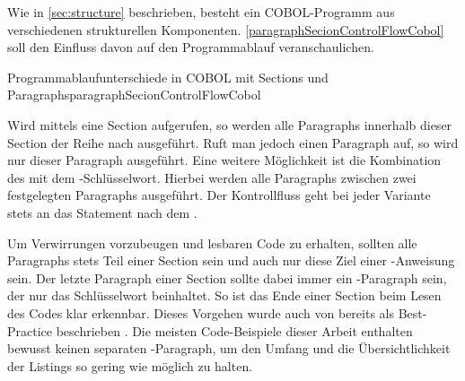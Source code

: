 Wie in \autoref{sec:structure} beschrieben, besteht ein COBOL-Programm aus verschiedenen strukturellen Komponenten. \autoref{paragraphSecionControlFlowCobol} soll den Einfluss davon auf den Pro\-grammab\-lauf veranschaulichen.

\begin{codeWithCaption}{Programmablaufunterschiede in COBOL mit Sections und Paragraphs}{paragraphSecionControlFlowCobol}
\end{codeWithCaption}

Wird mittels  eine Section aufgerufen, so werden alle Paragraphs innerhalb dieser Section der Reihe nach ausgeführt. Ruft man jedoch einen Paragraph auf, so wird nur dieser Paragraph ausgeführt. Eine weitere Möglichkeit ist die Kombination des  mit dem -Schlüsselwort. Hierbei werden alle Paragraphs zwischen zwei festgelegten Paragraphs ausgeführt. Der Kontrollfluss geht bei jeder Variante stets an das Statement nach dem .

Um Verwirrungen vorzubeugen und lesbaren Code zu erhalten, sollten alle Paragraphs stets Teil einer Section sein und auch nur diese Ziel einer -Anweisung sein. Der letzte Paragraph einer Section sollte dabei immer ein -Paragraph sein, der nur das Schlüsselwort  beinhaltet. So ist das Ende einer Section beim Lesen des Codes klar erkennbar. Dieses Vorgehen wurde auch von \citeauthor{richards_enhancing_1984} bereits \citeyear{richards_enhancing_1984} als Best-Practice beschrieben  \cite{richards_enhancing_1984}. Die meisten Code-Beispiele dieser Arbeit enthalten bewusst keinen separaten -Paragraph, um den Umfang und die Übersichtlichkeit der Listings so gering wie möglich zu halten. 